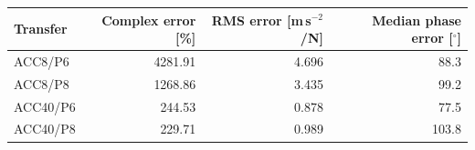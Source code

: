 \begin{tabular}{lrrr}\toprule
Transfer & Complex error [\%] & RMS error [m\,s$^{-2}$/N] & Median phase error [$^\circ$]\\\midrule
ACC8/P6 & 4281.91 & 4.696 & 88.3\\
ACC8/P8 & 1268.86 & 3.435 & 99.2\\
ACC40/P6 & 244.53 & 0.878 & 77.5\\
ACC40/P8 & 229.71 & 0.989 & 103.8\\
\bottomrule\end{tabular}
